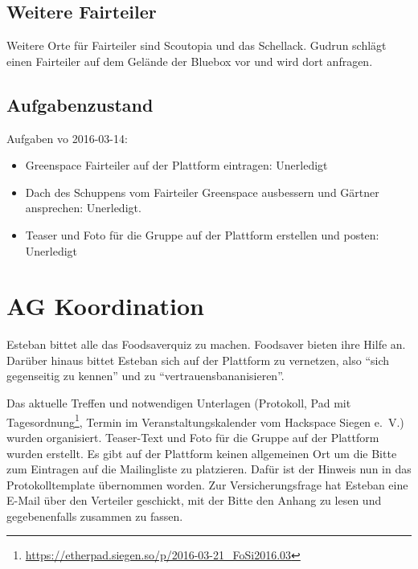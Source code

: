 \documentclass{scrreprt}
\begin{document}
\subsection{Weitere Fairteiler}
Weitere Orte für Fairteiler sind Scoutopia und das Schellack. Gudrun schlägt einen Fairteiler auf dem Gelände der Bluebox vor und wird dort anfragen.
\subsection{Aufgabenzustand}
Aufgaben vo 2016-03-14:
	\begin{itemize}
		\item Greenspace Fairteiler auf der Plattform eintragen: Unerledigt
		\item Dach des Schuppens vom Fairteiler Greenspace ausbessern und Gärtner ansprechen: Unerledigt.
		\item Teaser und Foto für die Gruppe auf der Plattform erstellen und posten: Unerledigt
	\end{itemize}
	
\section{AG Koordination}
Esteban bittet alle das Foodsaverquiz zu machen. Foodsaver bieten ihre Hilfe an. Darüber hinaus bittet Esteban sich auf der Plattform zu vernetzen, also \enquote{sich gegenseitig zu kennen} und zu \enquote{vertrauensbananisieren}.\par
Das aktuelle Treffen und notwendigen Unterlagen (Protokoll, Pad mit Tagesordnung\footnote{\url{https://etherpad.siegen.so/p/2016-03-21_FoSi2016.03}}, Termin im Veranstaltungskalender vom Hackspace Siegen e.~V.) wurden organisiert. Teaser-Text und Foto für die Gruppe auf der Plattform wurden erstellt. Es gibt auf der Plattform keinen allgemeinen Ort um die Bitte zum Eintragen auf die Mailingliste zu platzieren. Dafür ist der Hinweis nun in das Protokolltemplate übernommen worden. Zur Versicherungsfrage hat Esteban eine E-Mail über den Verteiler geschickt, mit der Bitte den Anhang zu lesen und gegebenenfalls zusammen zu fassen. 
 
\end{document}
